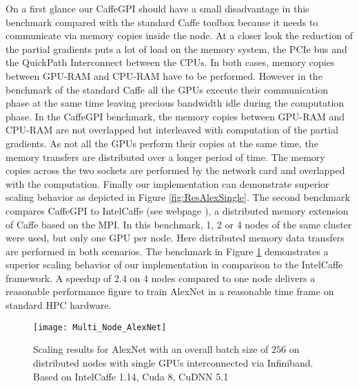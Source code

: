 \documentclass[twoside,twocolumn]{article}
\begin{document}
On a first glance our CaffeGPI should have a small disadvantage in this benchmark
compared with the standard Caffe toolbox because it
needs to communicate via memory copies inside the node. At a closer look
the reduction of the partial gradients puts a lot of load on the memory system,
the PCIe bus and the QuickPath Interconnect between the CPUs. In both cases, 
memory copies between GPU-RAM and CPU-RAM have to be performed.
However in the benchmark of the  standard Caffe all the GPUs execute their communication phase
at the same time leaving precious bandwidth idle during the computation phase.
In the CaffeGPI benchmark, the memory copies between GPU-RAM and CPU-RAM are not
overlapped but interleaved with computation of the partial gradients. As not all the 
GPUs perform their copies at the same time, the memory transfers are distributed
over a longer period of time. The memory copies 
across the two sockets are performed by the network card and overlapped with the computation.
Finally our implementation can
demonstrate superior scaling behavior as depicted in Figure \ref{fig:ResAlexSingle}.
The second benchmark compares CaffeGPI to Intel\texttrademark Caffe (see webpage \cite{intelcaffe}),
a distributed memory
extension of Caffe based on the MPI.
In this benchmark, 1, 2 or 4 nodes
of the same cluster were used, but only one GPU per node. Here distributed memory
data transfers are performed in both scenarios.
The benchmark in Figure \ref{fig:ResAlexDist}
 demonstrates a superior scaling behavior of our implementation
in comparison to the Intel\texttrademark Caffe framework. A  speedup of 2.4 on 4 nodes compared
to one node delivers a reasonable  performance figure to train AlexNet in a
reasonable time frame on standard HPC hardware.

\begin{figure}[htbp]
\centering%
\texttt{[image: Multi\_Node\_AlexNet]}
\caption{Scaling results for AlexNet with an overall  batch size of $256$ on distributed nodes with single GPUs interconnected via Infiniband. Based on Intel\texttrademark Caffe 1.14, Cuda 8, CuDNN 5.1}
\label{fig:ResAlexDist}
\end{figure}
\end{document}
